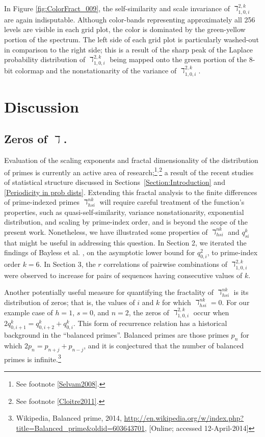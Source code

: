 \documentclass[12pt,longtitle,times]{amsart}
\begin{document}
\pagebreak
In Figure \ref{fig:ColorFract_009}, the self-similarity and scale invariance of $\daleth_{1,0,i}^{2,k}$ are again indisputable. Although color-bands representing approximately all 256 levels are visible in each grid plot, the color is dominated by the green-yellow portion of the spectrum. The left side of each grid plot is particularly washed-out in comparison to the right side; this is a result of the sharp peak of the Laplace probability distribution of $\daleth_{1,0,i}^{2,k}$ being mapped onto the green portion of the 8-bit colormap and the nonstationarity of the variance of $\daleth_{1,0,i}^{2,k}$.

\section{Discussion}\label{Section:Discussion}

\subsection[short]{Zeros of $\daleth$.} Evaluation of the scaling exponents and fractal dimensionality of the distribution of primes is currently an active area of research;\cite{Cattani-Fractal-2010,Holdom-Scale-Invariant-2009,Scafetta2004,Wolf-Nearest_Neighbor-2014}\footnote{See footnote \ref{Selvam2008}.}$^,$\footnote{See footnote \ref{Cloitre2011}.} a result of the recent studies of statistical structure discussed in \mbox{Sections \ref{Section:Introduction}} and \ref{Periodicity in prob dists}. Extending this fractal analysis to the finite differences of prime-indexed primes $\daleth_{hsi}^{nk}$ will require careful treatment of the function's properties, such as quasi-self-similarity, variance nonstationarity, exponential distribution, and scaling by prime-index order, and is beyond the scope of the present work. Nonetheless, we have illustrated some properties of $\daleth_{hsi}^{nk}$ and $q_{si}^k$ that might be useful in addressing this question. In Section 2, we iterated the findings of Bayless et al. \cite{Bayless2013}, on the asymptotic lower bound for $q_{0,i}^2$, to prime-index order $k=6$. In Section 3, the $r$ correlations of pairwise combinations of $\daleth_{1,0,i}^{2,k}$ were observed to increase for pairs of sequences having consecutive values of $k$. 

Another potentially useful measure for quantifying the fractality of $\daleth_{hsi}^{nk}$ is its distribution of zeros; that is, the values of $i$ and $k$ for which $\daleth_{hsi}^{nk}=0$. For our example case of $h=1$, $s=0$, and $n=2$, the zeros of $\daleth_{1,0,i}^{2,k}$ occur when $2q_{0,i+1}^k=q_{0,i+2}^k+q_{0,i}^k$. This form of recurrence relation has a historical background in the ``balanced primes''\cite{Broughan-Shifted-2012,Ghusayni-subsets-of-primes-2012}. Balanced primes are those primes $p_n$ for which $2p_n = p_{n+j}+p_{n-j}$, and it is conjectured that the number of balanced primes is infinite.\footnote{Wikipedia, Balanced prime, 2014, \url{http://en.wikipedia.org/w/index.php?title=Balanced_prime&oldid=603643701}, [Online; accessed  12-April-2014]}
\end{document}
